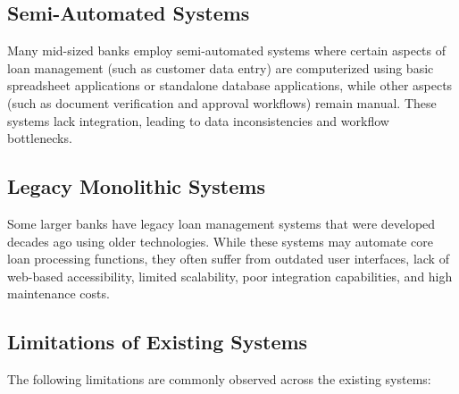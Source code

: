 \subsection{Semi-Automated Systems}

Many mid-sized banks employ semi-automated systems where certain aspects of loan management (such as customer data entry) are computerized using basic spreadsheet applications or standalone database applications, while other aspects (such as document verification and approval workflows) remain manual. These systems lack integration, leading to data inconsistencies and workflow bottlenecks.

\subsection{Legacy Monolithic Systems}

Some larger banks have legacy loan management systems that were developed decades ago using older technologies. While these systems may automate core loan processing functions, they often suffer from outdated user interfaces, lack of web-based accessibility, limited scalability, poor integration capabilities, and high maintenance costs.

\subsection{Limitations of Existing Systems}

The following limitations are commonly observed across the existing systems:

